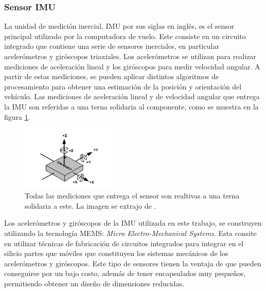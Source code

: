 




\subsubsection{Sensor IMU}\label{sec:IMU}

La unidad de medición inercial, IMU por sus siglas en inglés, es el sensor principal utilizado por la computadora de vuelo. Este consiste en un circuito integrado que contiene una serie de sensores inerciales, en particular acelerómetros y giróscopos triaxiales. Los acelerómetros se utilizan para realizar mediciones de aceleración lineal y los giróscopos para medir velocidad angular. A partir de estas mediciones, se pueden aplicar distintos algoritmos de procesamiento para obtener una estimación de la posición y orientación del vehículo. Las mediciones de aceleración lineal y de velocidad angular que entrega la IMU son referidas a una terna solidaria al componente, como se muestra en la figura \ref{fig:IMU_ejes}.

\begin{figure}[H]
    \centering
    \includegraphics[width=0.4\textwidth]{img/IMU_ejes.png}
    \caption{Todas las mediciones que entrega el sensor son realtivas a una terna solidaria a este. La imagen se extrajo de \cite{ICM42688pDatasheet}.}
    \label{fig:IMU_ejes}
\end{figure}

Los acelerómetros y giróscopos de la IMU utilizada en este trabajo, se construyen utilizando la tecnología MEMS: \textit{Micro Electro-Mechanical Systems}. Esta consite en utilizar técnicas de fabricación de circuitos integrados para integrar en el silicio partes que móviles que constituyen los sistemas mecánicos de los acelerómetros y giróscopos. Este tipo de sensores tienen la ventaja de que pueden conseguirse por un bajo costo, además de tener encapsulados muy pequeños, permitiendo obtener un diseño de dimensiones reducidas. 


